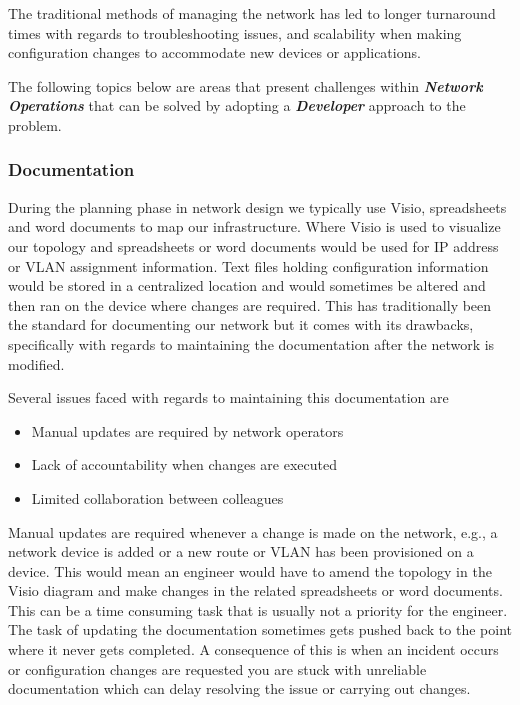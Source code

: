 \documentclass[12pt, letterpaper]{article}
\begin{document}
\smallskip

The traditional methods of managing the network has led to longer turnaround times with regards to troubleshooting issues, and scalability when making configuration changes to accommodate new devices or applications.

\smallskip

The following topics below are areas that present challenges within \textbf{\textit{Network Operations}} that can be solved by adopting a \textbf{\textit{Developer}} approach to the problem.

	\subsubsection{Documentation}
During the planning phase in network design we typically use Visio, spreadsheets and word documents to map our infrastructure. Where Visio is used to visualize our topology and spreadsheets or word documents would be used for IP address or VLAN assignment information. Text files holding configuration information would be stored in a centralized location and would sometimes be altered and then ran on the device where changes are required. This has traditionally been the standard for documenting our network but it comes with its drawbacks, specifically with regards to maintaining the documentation after the network is modified.

\vspace{0.1mm}

Several issues faced with regards to maintaining this documentation are

\begin{itemize}
\item Manual updates are required by network operators
\item Lack of accountability when changes are executed
\item Limited collaboration between colleagues
\end{itemize}


Manual updates are required whenever a change is made on the network, e.g., a \\ network device is added or a new route or VLAN has been provisioned on a device. This would mean an engineer would have to amend the topology in the Visio diagram and make changes in the related spreadsheets or word documents. This can be a time consuming task that is usually not a priority for the engineer. The task of updating the documentation sometimes gets pushed back to the point where it never gets completed. A consequence of this is when an incident occurs or configuration changes are requested you are stuck with unreliable documentation which can delay resolving the issue or carrying out changes.
\end{document}
